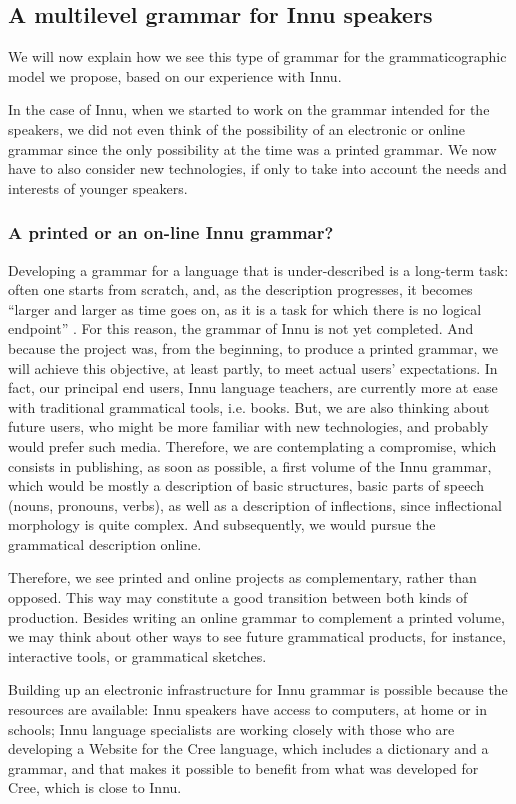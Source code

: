 \subsection{A multilevel grammar for Innu speakers}
We will now explain how we see this type of grammar for the grammaticographic model we propose, based on our experience with Innu.

In the case of Innu, when we started to work on the grammar intended for the speakers, we did not even think of the possibility of an electronic or online grammar since the only possibility at the time was a printed grammar. We now have to also consider new technologies, if only to take into account the needs and interests of younger speakers. 

\subsubsection{A printed or an on-line Innu grammar?}
Developing a grammar for a language that is under-described is a long-term task: often one starts from scratch, and, as the description progresses, it becomes ``larger and larger as time goes on, as it is a task for which there is no logical endpoint'' \citep[400]{Rice2006}. For this reason, the grammar of Innu is not yet completed. And because the project was, from the beginning, to produce a printed grammar, we will achieve this objective, at least partly, to meet actual users' expectations. In fact, our principal end users, Innu language teachers, are currently more at ease with traditional grammatical tools, i.e. books. But, we are also thinking about future users, who might be more familiar with new technologies, and probably would prefer such media. Therefore, we are contemplating a compromise, which consists in publishing, as soon as possible, a first volume of the Innu grammar, which would be mostly a description of basic structures, basic parts of speech (nouns, pronouns, verbs), as well as a description of inflections, since inflectional morphology is quite complex. And subsequently, we would pursue the grammatical description online.

Therefore, we see printed and online projects as complementary, rather than opposed. This way may constitute a good transition between both kinds of production. Besides writing an online grammar to complement a printed volume, we may think about other ways to see future grammatical products, for instance, interactive tools, or grammatical sketches.

Building up an electronic infrastructure for Innu grammar is possible because the resources are available: Innu speakers have access to computers, at home or in schools; Innu language specialists are working closely with those who are developing a Website for the Cree language, which includes a dictionary and a grammar, and that makes it possible to benefit from what was developed for Cree, which is close to Innu.

